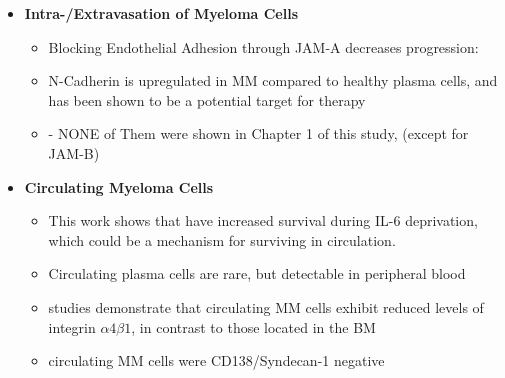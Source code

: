 \begin{itemize}
      \item \textbf{Intra-/Extravasation of Myeloma Cells}
            \begin{itemize}
                  \item Blocking Endothelial Adhesion through JAM-A decreases
                        progression: \cite{solimandoHaltingViciousCycle2020}
                  \item N-Cadherin is upregulated in MM compared to healthy
                        plasma cells, and has been shown to be a potential target for
                        therapy \cite{mrozikTherapeuticTargetingNcadherin2015}
                  \item - NONE of Them were shown in Chapter 1 of this study, (except for JAM-B)
            \end{itemize}

      \item \textbf{Circulating Myeloma Cells}
            \begin{itemize}
                  \item This work shows that \nMAina have increased survival
                        during IL-6 deprivation, which could be a mechanism for
                        surviving in circulation.
                  \item Circulating plasma cells are rare, but detectable in
                        peripheral blood
                        \cite{witzigDetectionMyelomaCells1996}
                  \item studies demonstrate that circulating \ac{MM} cells
                        exhibit reduced levels of integrin $\alpha4\beta1$, in
                        contrast to those located in the \ac{BM}
                        \cite{paivaDetailedCharacterizationMultiple2013,
                              paivaCompetitionClonalPlasma2011}
                  \item circulating MM cells were CD138/Syndecan-1 negative
                        \cite{akhmetzyanovaDynamicCD138Surface2020}

            \end{itemize}


\end{itemize}
